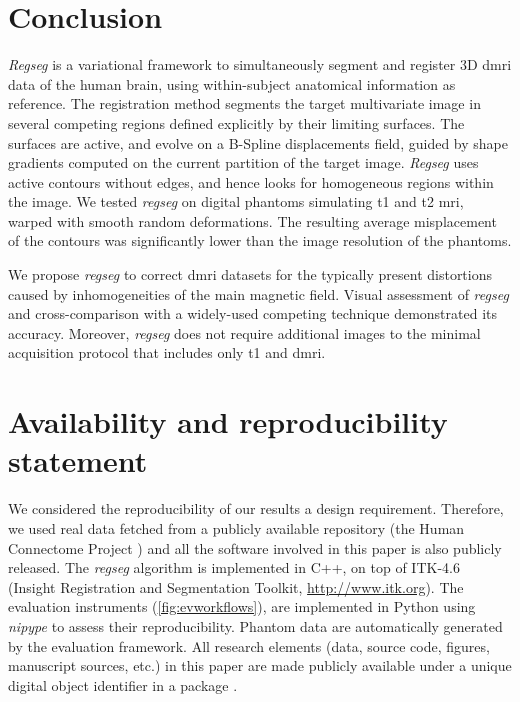 \section*{Conclusion}
\label{sec:conclusion}

\emph{Regseg} is a variational framework to simultaneously segment and
  register 3D \gls*{dmri} data of the human brain, using within-subject
  anatomical information as reference.
The registration method segments the target multivariate image in several competing regions
  defined explicitly by their limiting surfaces.
The surfaces are active, and evolve on a B-Spline displacements field, guided by shape
  gradients computed on the current partition of the target image.
\emph{Regseg} uses active contours without edges, and hence looks for
  homogeneous regions within the image.
We tested \emph{regseg} on digital phantoms simulating \gls*{t1} and \gls*{t2} \gls*{mri},
	warped with smooth random deformations.
The resulting average misplacement of the contours was significantly lower than the
  image resolution of the phantoms.

We propose \emph{regseg} to correct \gls*{dmri} datasets for the typically present distortions
  caused by inhomogeneities of the main magnetic field.
Visual assessment of \emph{regseg} and cross-comparison with a widely-used competing
  technique demonstrated its accuracy.
Moreover, \emph{regseg} does not require additional images to the minimal acquisition protocol
  that includes only \gls*{t1} and \gls*{dmri}.

\section*{Availability and reproducibility statement}
\label{sec:availability}
We considered the reproducibility of our results a design requirement.
Therefore, we used real data fetched from a publicly available repository
  (the Human Connectome Project \citep{essen_human_2012}) and all the software
  involved in this paper is also publicly released.
The \emph{regseg} algorithm is implemented in C++, on top of ITK-4.6
  (Insight Registration and Segmentation Toolkit, \url{http://www.itk.org}).
The evaluation instruments (\autoref{fig:evworkflows}), are implemented in Python using
  \emph{nipype} \citep{gorgolewski_nipype_2011} to assess their reproducibility.
Phantom data are automatically generated by the evaluation framework.
All research elements (data, source code, figures, manuscript sources, etc.) in this paper
  are made publicly available under a unique digital object identifier in a
  package \citep{esteban_acweregistration_2015}.